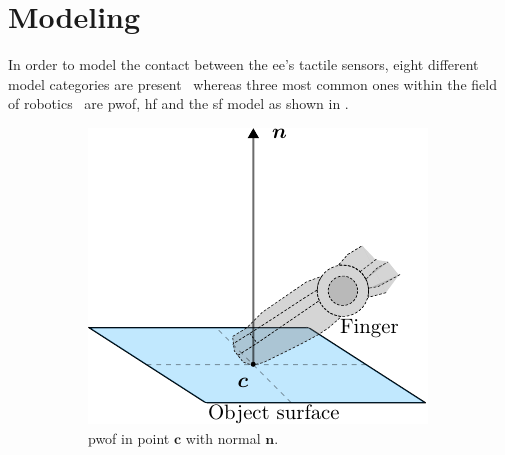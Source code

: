 
\chapter{Modeling} \label{ch:modeling}

In order to model the contact between the \gls{ee}'s tactile sensors, eight different model categories are present~\cite{articulated-hands-force-control-and-kinematic-issues} whereas three most common ones within the field of robotics~\cite[Chapter 37]{handbook-of-robotics} are \gls{pwof}, \gls{hf} and the \gls{sf} model as shown in . \medskip

\begin{figure}[h]
	\centering
	\begin{subfigure}[b]{0.3\textwidth}
		\centering
		\includegraphics[width=\textwidth]{chapters/modeling/fig/contact-no-friction-crop.pdf}
		\caption{\gls{pwof} in point $\bm{c}$ with normal $\bm{n}$. \\\hspace{\textwidth} }
		\label{fig:pwof}
	\end{subfigure}
	\hfill
	\begin{subfigure}[b]{0.3\textwidth}
		\centering

\end{subfigure}
\end{figure}
